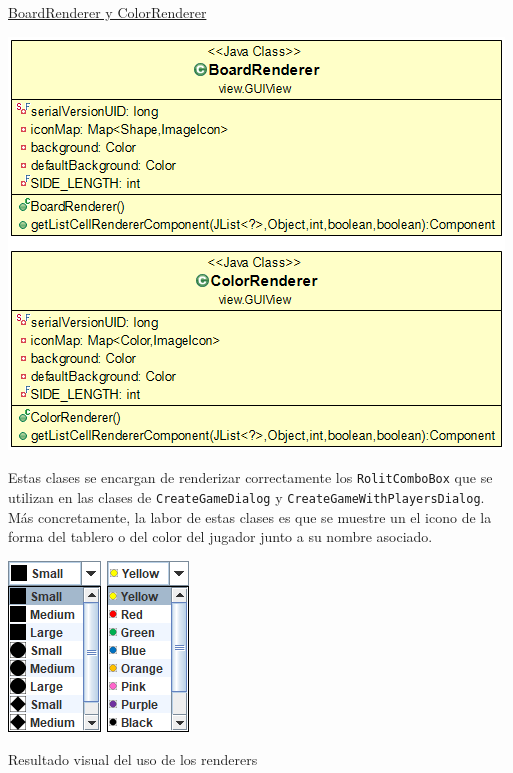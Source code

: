 \documentclass[12pt,a4paper,openright]{book}
\theoremstyle{break}
\begin{document}
\underline{BoardRenderer y ColorRenderer}
\begin{center}
\includegraphics[scale=0.6]{renderers.png}
\end{center}

Estas clases se encargan de renderizar correctamente los \texttt{RolitComboBox} que se utilizan en las clases de \texttt{CreateGameDialog} y \texttt{CreateGameWithPlayersDialog}. Más concretamente, la labor de estas clases es que se muestre un el icono de la forma del tablero o del color del jugador junto a su nombre asociado.

\begin{center}
\includegraphics[scale=1]{shapecombo.png}
\includegraphics[scale=1]{colorcombo.png}

Resultado visual del uso de los renderers
\end{center}
\end{document}
